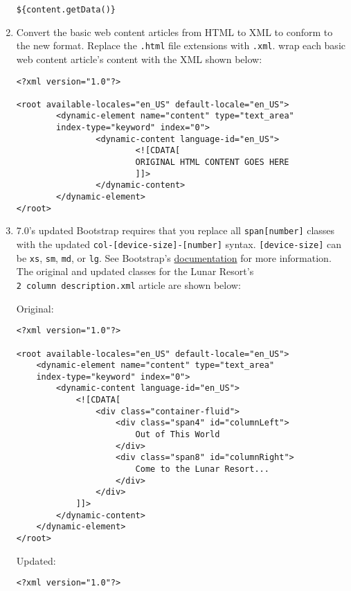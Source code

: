\begin{enumerate}
\begin{verbatim}
${content.getData()}
\end{verbatim}
\item
  Convert the basic web content articles from HTML to XML to conform to
  the new format. Replace the \texttt{.html} file extensions with
  \texttt{.xml}. wrap each basic web content article's content with the
  XML shown below:

\begin{verbatim}
<?xml version="1.0"?>

<root available-locales="en_US" default-locale="en_US">
        <dynamic-element name="content" type="text_area"
        index-type="keyword" index="0">
                <dynamic-content language-id="en_US">
                        <![CDATA[
                        ORIGINAL HTML CONTENT GOES HERE
                        ]]>
                </dynamic-content>
        </dynamic-element>
</root>
\end{verbatim}
\item
  7.0's updated Bootstrap requires that you replace all
  \texttt{span{[}number{]}} classes with the updated
  \texttt{col-{[}device-size{]}-{[}number{]}} syntax.
  \texttt{{[}device-size{]}} can be \texttt{xs}, \texttt{sm},
  \texttt{md}, or \texttt{lg}. See Bootstrap's
  \href{https://getbootstrap.com/docs/4.0/layout/grid/}{documentation}
  for more information. The original and updated classes for the Lunar
  Resort's \texttt{2\ column\ description.xml} article are shown below:

  Original:

\begin{verbatim}
<?xml version="1.0"?>

<root available-locales="en_US" default-locale="en_US">
    <dynamic-element name="content" type="text_area"
    index-type="keyword" index="0">
        <dynamic-content language-id="en_US">
            <![CDATA[
                <div class="container-fluid">
                    <div class="span4" id="columnLeft">
                        Out of This World
                    </div>
                    <div class="span8" id="columnRight">
                        Come to the Lunar Resort...
                    </div>
                </div>
            ]]>
        </dynamic-content>
    </dynamic-element>
</root>
\end{verbatim}

  Updated:

\begin{verbatim}
<?xml version="1.0"?>


\end{verbatim}
\end{enumerate}
